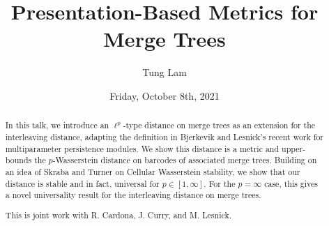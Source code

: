 \documentclass{UAmathtalk}
\author{Tung Lam}
\title{Presentation-Based Metrics for Merge Trees}
\date{Friday, October 8th, 2021}
\begin{document}
\maketitle

%

\begin{abstract}
In this talk, we introduce an $\ell^p$-type distance on merge trees as an extension for the interleaving distance, adapting the definition in Bjerkevik and Lesnick's recent work for multiparameter persistence modules. We show this distance is a metric and upper-bounds the $p$-Wasserstein distance on barcodes of associated merge trees. Building on an idea of Skraba and Turner on Cellular Wasserstein stability, we show that our distance is stable and in fact, universal for $p \in [1, \infty]$. For the $p=\infty$ case, this gives a novel universality result for the interleaving distance on merge trees.

This is joint work with R. Cardona, J. Curry, and M. Lesnick.
\end{abstract}
\end{document}
